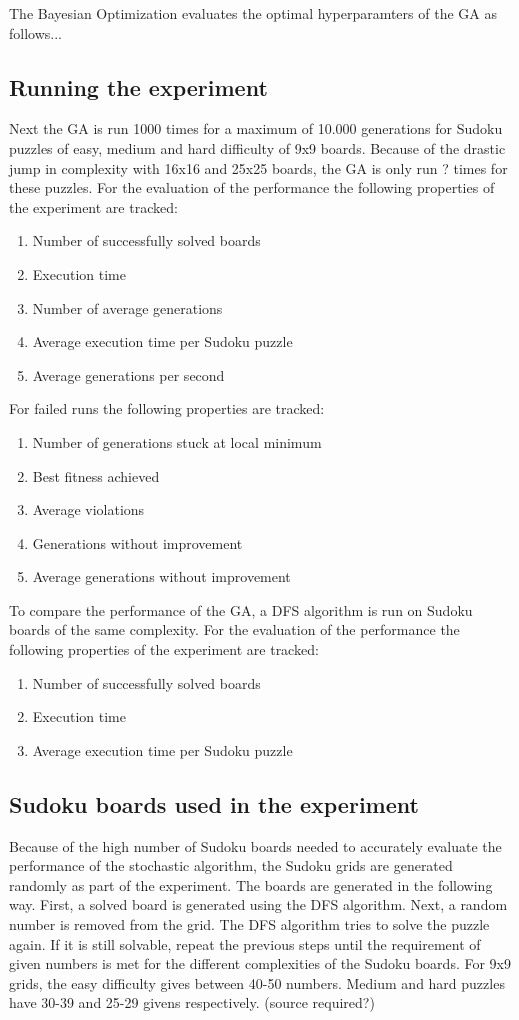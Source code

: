 The Bayesian Optimization evaluates the optimal hyperparamters of the GA as follows...

\subsection{Running the experiment}
Next the GA is run 1000 times for a maximum of 10.000 generations for Sudoku puzzles of easy, medium and hard difficulty of 9x9 boards. Because of the drastic jump in complexity with 16x16 and 25x25 boards, the GA is only run ? times for these puzzles. For the evaluation of the performance the following properties of the experiment are tracked:
\begin{enumerate}
	\item Number of successfully solved boards
	\item Execution time
	\item Number of average generations
	\item Average execution time per Sudoku puzzle
	\item Average generations per second
\end{enumerate}

For failed runs the following properties are tracked:
\begin{enumerate}
	\item Number of generations stuck at local minimum
	\item Best fitness achieved
	\item Average violations
	\item Generations without improvement
	\item Average generations without improvement
\end{enumerate}

To compare the performance of the GA, a DFS algorithm is run on Sudoku boards of the same complexity. For the evaluation of the performance the following properties of the experiment are tracked:
\begin{enumerate}
	\item Number of successfully solved boards
	\item Execution time
	\item Average execution time per Sudoku puzzle
\end{enumerate}

\subsection{Sudoku boards used in the experiment}
Because of the high number of Sudoku boards needed to accurately evaluate the performance of the stochastic algorithm, the Sudoku grids are generated randomly as part of the experiment. The boards are generated in the following way. 
First, a solved board is generated using the DFS algorithm. Next, a random number is removed from the grid. The DFS algorithm tries to solve the puzzle again. If it is still solvable, repeat the previous steps until the requirement of given numbers is met for the different complexities of the Sudoku boards. For 9x9 grids, the easy difficulty gives between 40-50 numbers. Medium and hard puzzles have 30-39 and 25-29 givens respectively. (source required?)

